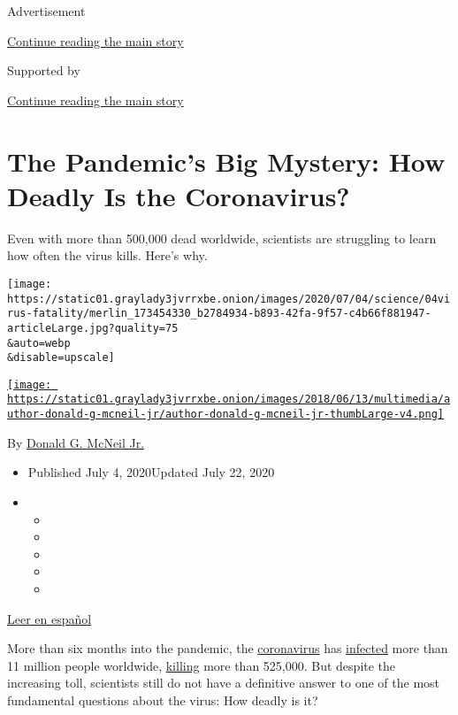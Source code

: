 Advertisement

\protect\hyperlink{after-top}{Continue reading the main story}

Supported by

\protect\hyperlink{after-sponsor}{Continue reading the main story}

\hypertarget{the-pandemics-big-mystery-how-deadly-is-the-coronavirus}{%
\section{The Pandemic's Big Mystery: How Deadly Is the
Coronavirus?}\label{the-pandemics-big-mystery-how-deadly-is-the-coronavirus}}

Even with more than 500,000 dead worldwide, scientists are struggling to
learn how often the virus kills. Here's why.

\texttt{[image: https://static01.graylady3jvrrxbe.onion/images/2020/07/04/science/04virus-fatality/merlin\_173454330\_b2784934-b893-42fa-9f57-c4b66f881947-articleLarge.jpg?quality=75\\\&auto=webp\\\&disable=upscale]}

\href{https://www.nytimes3xbfgragh.onion/by/donald-g-mcneil-jr}{\texttt{[image: https://static01.graylady3jvrrxbe.onion/images/2018/06/13/multimedia/author-donald-g-mcneil-jr/author-donald-g-mcneil-jr-thumbLarge-v4.png]}}

By
\href{https://www.nytimes3xbfgragh.onion/by/donald-g-mcneil-jr}{Donald
G. McNeil Jr.}

\begin{itemize}
\item
  Published July 4, 2020Updated July 22, 2020
\item
  \begin{itemize}
  \item
  \item
  \item
  \item
  \item
  \end{itemize}
\end{itemize}

\href{https://www.nytimes3xbfgragh.onion/es/2020/07/06/espanol/tasa-mortalidad-fatalidad-coronavirus.html}{Leer
en español}

More than six months into the pandemic, the
\href{https://www.nytimes3xbfgragh.onion/2020/07/22/us/florida-mother-2-children-covid-19.html}{coronavirus}
has
\href{https://www.nytimes3xbfgragh.onion/2020/07/15/health/coronavirus-schools-reopening.html}{infected}
more than 11 million people worldwide,
\href{https://www.nytimes3xbfgragh.onion/2020/07/13/us/arizona-coronavirus-mark-anthony-urquiza.html}{killing}
more than 525,000. But despite the increasing toll, scientists still do
not have a definitive answer to one of the most fundamental questions
about the virus: How deadly is it?

